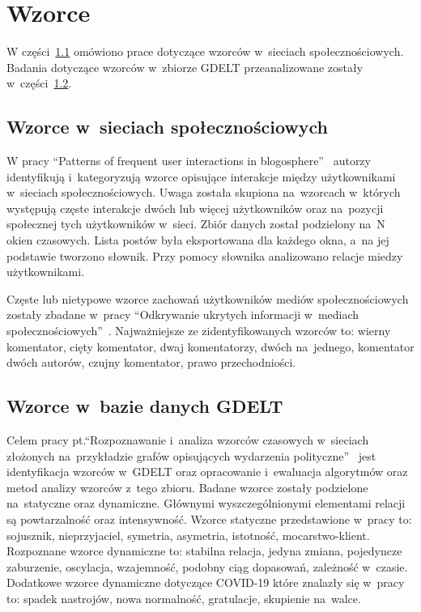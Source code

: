 \documentclass[11pt]{report}
\begin{document}
    \section{Wzorce}\label{sec:wzorce}
    W części~\ref{subsec:wzorce-w-sieciach-społecznościowych} omówiono prace dotyczące wzorców w~sieciach społecznościowych.
    Badania dotyczące wzorców w~zbiorze GDELT przeanalizowane zostały w~części~\ref{subsec:wzorce-gdelt}.

    \subsection{Wzorce w~sieciach społecznościowych}\label{subsec:wzorce-w-sieciach-społecznościowych}
    W pracy ``Patterns of frequent user interactions in blogosphere''~\cite{10.1093/jigpal/jzaa042} autorzy identyfikują i~kategoryzują wzorce opisujące interakcje między użytkownikami w~sieciach społecznościowych.
    Uwaga została skupiona na~wzorcach w~których występują częste interakcje dwóch lub więcej użytkowników oraz na~pozycji społecznej tych użytkowników w~sieci.
    Zbiór danych został podzielony na~N okien czasowych.
    Lista postów była eksportowana dla każdego okna, a~na jej podstawie tworzono słownik.
    Przy pomocy słownika analizowano relacje miedzy użytkownikami.

    Częste lub nietypowe wzorce zachowań użytkowników mediów społecznościowych
    zostały zbadane w~pracy ``Odkrywanie ukrytych informacji w~mediach społecznościowych''~\cite{Skwara2019}.
    Najważniejsze ze zidentyfikowanych wzorców to: wierny komentator, cięty komentator, dwaj komentatorzy, dwóch na~jednego, komentator dwóch autorów, czujny komentator, prawo przechodniości.

    \subsection{Wzorce w~bazie danych GDELT}\label{subsec:wzorce-gdelt}
    Celem pracy pt.\@ ``Rozpoznawanie i~analiza wzorców czasowych w~sieciach złożonych na~przykładzie grafów opisujących wydarzenia polityczne''~\cite{Jarosz2020}
    jest identyfikacja wzorców w~GDELT oraz opracowanie i~ewaluacja algorytmów oraz metod analizy wzorców z~tego zbioru.
    Badane wzorce zostały podzielone na~statyczne oraz dynamiczne.
    Głównymi wyszczególnionymi elementami relacji są powtarzalność oraz intensywność.
    Wzorce statyczne przedstawione w~pracy to: sojusznik, nieprzyjaciel, symetria, asymetria, istotność, mocarstwo-klient.
    Rozpoznane wzorce dynamiczne to: stabilna relacja, jedyna zmiana, pojedyncze zaburzenie, oscylacja, wzajemność, podobny ciąg dopasowań, zależność w~czasie.
    Dodatkowe wzorce dynamiczne dotyczące COVID-19 które znalazły się w~pracy to: spadek nastrojów, nowa normalność, gratulacje, skupienie na~walce.
\end{document}
